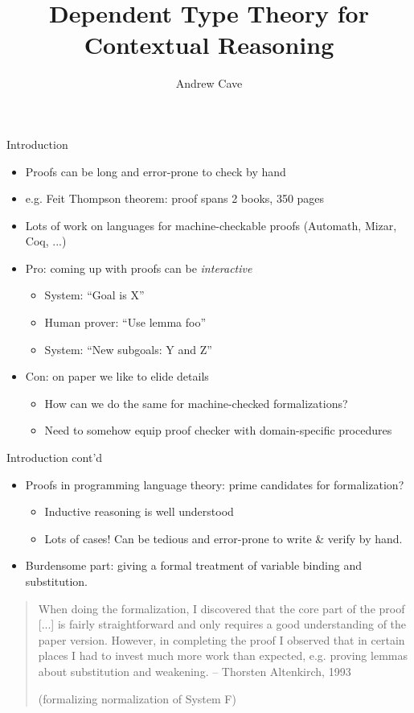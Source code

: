 \documentclass[usenames,dvipsnames]{beamer}
\author{Andrew Cave}
\title[{\makebox[.45\paperwidth]{Dependent Type Theory for Contextual Reasoning\hfill%
       \insertframenumber/\inserttotalframenumber}}]{Dependent Type Theory for Contextual Reasoning}
\begin{document}
\begin{frame}
\titlepage
\end{frame}

\begin{frame}{Introduction}
\begin{itemize}
\item Proofs can be long and error-prone to check by hand
\pause
\item e.g. Feit Thompson theorem: proof spans 2 books, 350 pages
\pause
\item Lots of work on languages for machine-checkable proofs (Automath, Mizar, Coq, ...)
\pause \item {\color{green} Pro:} coming up with proofs can be \emph{interactive}
\begin{itemize}
\item System: ``Goal is X''
\item Human prover: ``Use lemma foo''
\item System: ``New subgoals: Y and Z''
\end{itemize}
\pause \item {\color{red} Con:} on paper we like to elide details
\begin{itemize}
\item How can we do the same for machine-checked formalizations?
\item Need to somehow equip proof checker with domain-specific procedures
\end{itemize}
\end{itemize}
\end{frame}

\begin{frame}{Introduction cont'd}
\begin{itemize}
\item Proofs in programming language theory: prime
candidates for formalization?
\begin{itemize}
\item Inductive reasoning is well understood
\item Lots of cases! Can be
tedious and error-prone to write \& verify by hand.
\end{itemize}
\pause
\item Burdensome part: giving a formal treatment of variable binding and
substitution.
\end{itemize}
\pause
\begin{quote}
When doing the formalization, I discovered that the core part of the
proof [...] is fairly straightforward and
only requires a good understanding of the paper version. However, in
completing the proof I observed that in certain places I had to invest
much more work than expected, e.g. proving lemmas about substitution
and weakening. -- Thorsten Altenkirch, 1993

   (formalizing normalization of System F)
\end{quote}
\pause
\end{frame}
\end{document}
